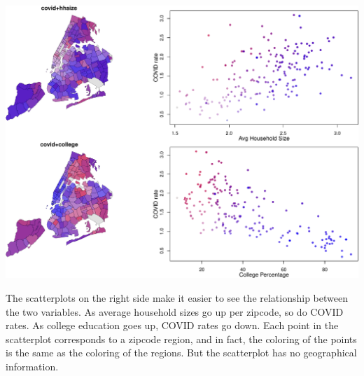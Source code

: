 \documentclass[openany]{book}
\newenvironment{Shaded}{\begin{snugshade}}{\end{snugshade}}
\newcommand{\DataTypeTok}[1]{\textcolor[rgb]{0.13,0.29,0.53}{#1}}
\newcommand{\DecValTok}[1]{\textcolor[rgb]{0.00,0.00,0.81}{#1}}
\newcommand{\KeywordTok}[1]{\textcolor[rgb]{0.13,0.29,0.53}{\textbf{#1}}}
\newcommand{\NormalTok}[1]{#1}
\newcommand{\OperatorTok}[1]{\textcolor[rgb]{0.81,0.36,0.00}{\textbf{#1}}}
\newcommand{\StringTok}[1]{\textcolor[rgb]{0.31,0.60,0.02}{#1}}
\begin{document}
\begin{Shaded}
\end{Shaded}

\begin{center}\includegraphics[width=0.9\linewidth]{figs/unnamed-chunk-98-1} \end{center}

The scatterplots on the right side make it easier to see the relationship between the two variables. As average household sizes go up per zipcode, so do COVID rates. As college education goes up, COVID rates go down. Each point in the scatterplot corresponds to a zipcode region, and in fact, the coloring of the points is the same as the coloring of the regions. But the scatterplot has no geographical information.
\end{document}
